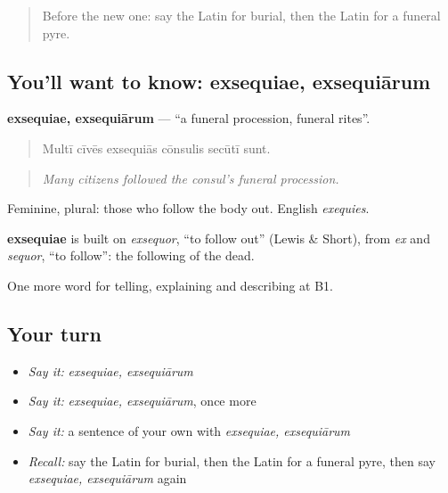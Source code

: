 \label{lesson:LA-C330-exsequiae}



\begin{quote}
Before the new one: say the Latin for burial, then the Latin for a funeral pyre.
\end{quote}

\subsection*{You'll want to know: exsequiae, exsequiārum}
\textbf{exsequiae, exsequiārum} — \textquotedblleft{}a funeral procession, funeral rites\textquotedblright{}.

\begin{quote}
Multī cīvēs exsequiās cōnsulis secūtī sunt.
\end{quote}

\begin{quote}
\emph{Many citizens followed the consul's funeral procession.}
\end{quote}

Feminine, plural: those who follow the body out. English \emph{exequies}.

\begin{cousinweb}
\textbf{exsequiae} is built on \emph{exsequor}, \textquotedblleft{}to follow out\textquotedblright{} (Lewis \& Short), from \emph{ex} and \emph{sequor}, \textquotedblleft{}to follow\textquotedblright{}: the following of the dead.
\end{cousinweb}

\begin{grammarlens}[title={What you've built}]
One more word for telling, explaining and describing at B1.
\end{grammarlens}

\subsection*{Your turn}
\begin{itemize}
\raggedright
  \item \emph{Say it:} \emph{exsequiae, exsequiārum}
  \item \emph{Say it:} \emph{exsequiae, exsequiārum}, once more
  \item \emph{Say it:} a sentence of your own with \emph{exsequiae, exsequiārum}
  \item \emph{Recall:} say the Latin for burial, then the Latin for a funeral pyre, then say \emph{exsequiae, exsequiārum} again
\end{itemize}

